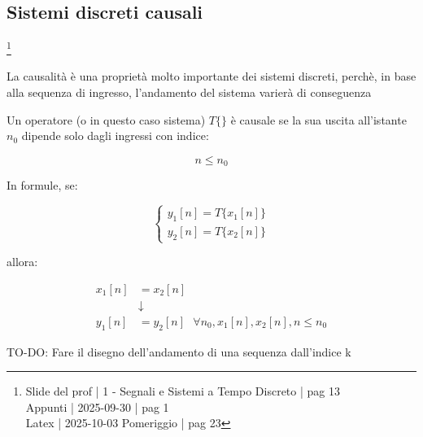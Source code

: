 \newpage 

\subsection{Sistemi discreti causali}

\footnote{ 
    Slide del prof | 1 - Segnali e Sistemi a Tempo Discreto | pag 13\\
    Appunti | 2025-09-30 | pag 1 \\
    Latex | 2025-10-03 Pomeriggio | pag 23
}

\begin{tcolorbox}
La causalità è una proprietà molto importante dei sistemi discreti, 
perchè, in base alla sequenza di ingresso, 
l'andamento del sistema varierà di conseguenza  
\end{tcolorbox}

Un operatore (o in questo caso sistema) $T \{ \}$ è causale se 
la sua uscita all'istante $n_0$ dipende solo dagli ingressi con indice: 

{
    \Large 
    \begin{equation}
        n \leq n_0
    \end{equation}
}

In formule, se: 

{
    \Large 
    \begin{equation}
        \begin{cases}
            y_1 \left[ n\right]
            = 
            T \{ x_1 \left[ n\right]\}
            \\
            y_2 \left[ n\right]
            = 
            T \{ x_2 \left[ n\right]\}
        \end{cases}
    \end{equation}
}

allora: 

{
    \Large 
    \begin{equation}
        \begin{split}
            x_1 \left[ n\right] 
            &= 
            x_2 \left[ n\right]
            \\
            &\downarrow
            \\
            y_1 \left[ n\right] 
            &= 
            y_2 \left[ n\right] 
            \text{ }
            \forall n_0, x_1 \left[ n\right], x_2 \left[ n\right], n \leq n_0
        \end{split}
    \end{equation}
}

\begin{tcolorbox}[colback=green!5!white,colframe=green!75!black]
TO-DO: Fare il disegno dell'andamento di una sequenza dall'indice k 
\end{tcolorbox} 

